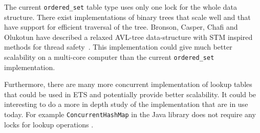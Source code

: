\documentclass[aps,pre,preprint,nofootinbib]{revtex4}
\begin{document}
  The current \verb|ordered_set| table type uses only one lock for the whole data structure.
  There exist implementations of binary trees that scale well and that have support for efficient traversal of the tree.
  Bronson, Casper, Chafi and Olukotun have described a relaxed AVL-tree data-structure with STM inspired methods for thread safety~\cite{BronsonPracTree}.
  This implementation could give much better scalability on a multi-core computer than the current \verb|ordered_set| implementation.

  Furthermore, there are many more concurrent implementation of lookup tables that could be used in ETS and potentially provide better scalability.
  It could be interesting to do a more in depth study of the implementation that are in use today.
  For example \verb|ConcurrentHashMap| in the Java library does not require any locks for lookup operations \cite{BrianConcHashMap}.





\end{document}

